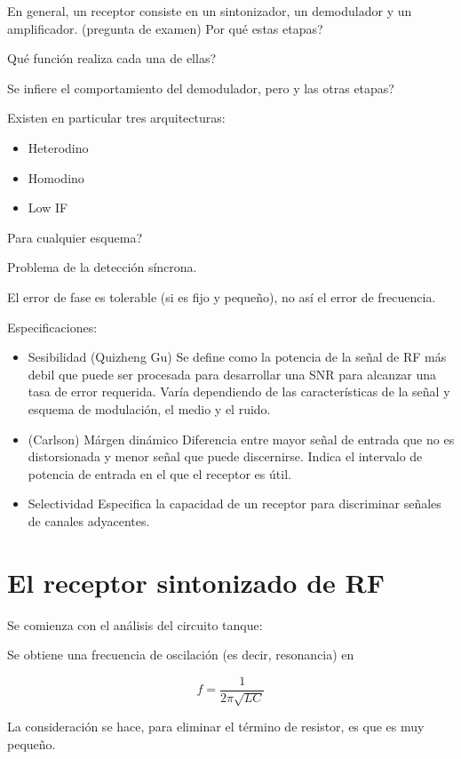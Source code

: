 \documentclass[12pt,letterpaper,titlepage,twoside]{book}
\begin{document}
En general, un receptor consiste en un sintonizador, un demodulador y un amplificador. (pregunta de examen) Por qué estas etapas? 

Qué función realiza cada una de ellas?

Se infiere el comportamiento del demodulador, pero y las otras etapas?

Existen en particular tres arquitecturas: 

\begin{itemize}
\item Heterodino
\item Homodino
\item Low IF
\end{itemize}
Para cualquier esquema?


Problema de la detección síncrona.


El error de fase es tolerable (si es fijo y pequeño), no así el error de frecuencia.

Especificaciones:

\begin{itemize}
\item Sesibilidad (Quizheng Gu) Se define como la potencia de la señal de RF más debil que puede ser procesada para desarrollar una SNR para alcanzar una tasa de error requerida.
Varía dependiendo de las características de la señal y esquema de modulación, el medio y el ruido.
\item(Carlson) Márgen dinámico  Diferencia entre mayor señal de entrada que no es distorsionada y menor señal que puede discernirse. Indica el intervalo de potencia de entrada en el que el receptor es útil.

\item Selectividad Especifica la capacidad de un receptor para discriminar señales de canales adyacentes.


\end{itemize}

\section{El receptor sintonizado de RF}
Se comienza con el análisis del circuito tanque: 

Se obtiene una frecuencia de oscilación (es decir, resonancia) en

\begin{equation}
f = \frac{1}{2 \pi \sqrt{LC} }
\end{equation}

La consideración se hace, para eliminar el término de resistor, es que es muy pequeño.
\end{document}
